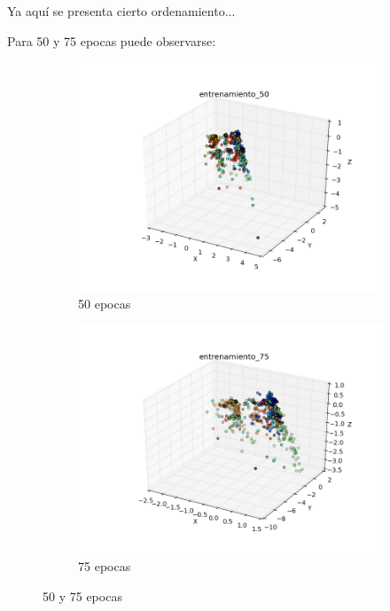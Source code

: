 Ya aquí se presenta cierto ordenamiento...

\pagebreak

Para 50 y 75 epocas puede observarse:

\begin{figure}[h!]
\centering
\begin{subfigure}{.5\textwidth}
  \centering
  \includegraphics[width=.9\linewidth]{img/convergencia_oja/entrenamiento_50.png}
  \caption{50 epocas}
  \label{fig:sub1}
\end{subfigure}%
\begin{subfigure}{.5\textwidth}
  \centering
  \includegraphics[width=.9\linewidth]{img/convergencia_oja/entrenamiento_75.png}
  \caption{75 epocas}
  \label{fig:sub2}
\end{subfigure}
\caption{50 y 75 epocas}
\label{fig:test}
\end{figure}

